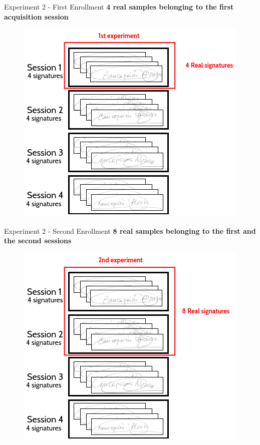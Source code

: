 \documentclass{beamer}
\begin{document}
\begin{frame}{Experiment 2 - First Enrollment}
\textbf{4 real samples belonging to the first acquisition session}
\begin{figure}[!htb]
\centering
\includegraphics[height=0.7\textheight]{slides/experiment21}
\end{figure}

\end{frame}


\begin{frame}{Experiment 2  - Second Enrollment}
\textbf{8 real samples belonging to the first and
  the second sessions}
\begin{figure}[!htb]
\centering
\includegraphics[height=0.7\textheight]{slides/experiment22}
\end{figure}


\end{frame}
\end{document}

